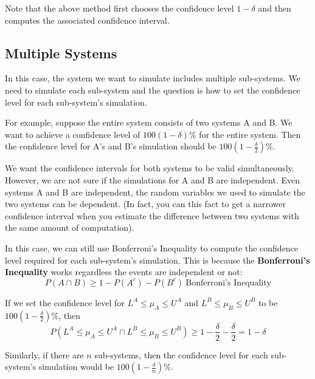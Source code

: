 \documentclass[11pt]{article}
\begin{document}
Note that the above method first chooses the confidence level $1 - \delta$ and then computes the associated confidence interval. 

\subsection{ Multiple Systems }
In this case, the system we want to simulate includes multiple sub-systems.
We need to simulate each sub-system and the question is how to set the confidence level for each sub-system's simulation.

For example, suppose the entire system consists of two systems A and B.
We want to achieve a confidence level of $100(1-\delta)\%$ for the entire system.
Then the confidence level for A's and B's simulation should be $100(1-\frac{\delta}{2})\%$.

We want the confidence intervals for both systems to be valid simultaneously.
However, we are not sure if the simulations for A and B are independent.
Even systems A and B are independent, the random variables we used to simulate the two systems can be dependent. 
(In fact, you can this fact to get a narrower confidence interval when you estimate the difference between two systems with the same amount of computation). 

In this case, we can still use Bonferroni's Inequality to compute the confidence level required for each sub-system's simulation. 
This is because the \textbf{Bonferroni's Inequality} works regardless the events are independent or not:
$$P(A \cap B) \geq 1 - P(A^c) - P(B^c) \: \text{Bonferroni's Inequality}$$ 

If we set the confidence level for $L^A \leq \mu_A \leq U^A$ and $L^B \leq \mu_B \leq U^B$ to be $100(1-\frac{\delta}{2})\%$, then 
$$P(L^A \leq \mu_A \leq U^A \cap L^B \leq \mu_B \leq U^B) \geq 1 - \frac{\delta}{2} - \frac{\delta}{2} = 1 - \delta$$

Similarly, if there are $n$ sub-systems, then the confidence level for each sub-system's simulation would be $100(1-\frac{\delta}{n})\%$.
\end{document}
